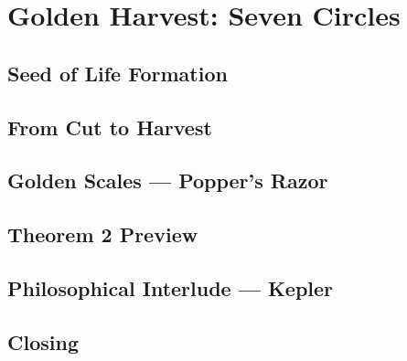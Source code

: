 \chapter{Golden Harvest: Seven Circles}
\section{Seed of Life Formation}
\section{From Cut to Harvest}
\section{Golden Scales — Popper's Razor}
\section{Theorem 2 Preview}
\section{Philosophical Interlude — Kepler}
\section{Closing}
